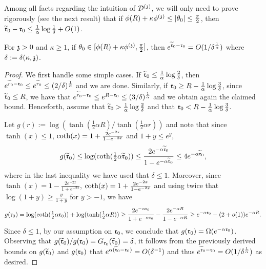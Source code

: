 Among all facts regarding the intuition of $\dt$, we will only need to prove rigorously (see the next result) that if $\phi(R)+\kappa\phi^{(\ss)}\leq |\theta_0|\leq\frac{\pi}{2}$, then $\widetilde{\rabs}_0-\rabs_0\leq\frac{1}{\alpha}\log\frac{1}{\delta}+O(1)$.
\begin{fact}\label{fct:radial-varphi2}
For $\ss> 0$ and $\kappa\geq 1$, 
if $\theta_0\in [\phi(R)+\kappa\phi^{(\ss)},\frac{\pi}{2}]$, then
  $e^{\widetilde{\rabs}_0-\rabs_0}=O(1/\delta^{\frac{1}{\alpha}})$
  where $\delta:=\delta(\kappa,\ss)$.
\end{fact}
\begin{proof}
We first handle some simple cases.
If $\widetilde{\rabs}_0\leq\frac{1}{\alpha}\log\frac{2}{\delta}$, then $e^{\widetilde{r}_0-\rabs_0}\leq e^{\widetilde{r}_0}\leq (2/\delta)^{\frac{1}{\alpha}}$ and we are done.
Similarly, if $\rabs_0\geq R-\frac{1}{\alpha}\log\frac{3}{\delta}$, since $\widetilde{\rabs}_0\leq R$, we have that $e^{\widetilde{r}_0-\rabs_0}\leq e^{R-\rabs_0}\leq (3/\delta)^{\frac{1}{\alpha}}$ and we obtain again the claimed bound. Henceforth, assume that $\widetilde{\rabs}_0>\frac{1}{\alpha}\log\frac{2}{\delta}$ and that $\rabs_0< R-\frac{1}{\alpha}\log\frac{3}{\delta}$.

Let $g(r):=\log(\tanh(\frac12\alpha R)/\tanh(\frac12\alpha r))$ and note that since $\tanh(x)\leq 1$, $\cotanh(x)=1+\frac{2e^{-2x}}{1-e^{-2x}}$ and $1+y\leq e^{y}$, 
\[g(\widetilde{\rabs}_0) \leq \log(\cotanh(\tfrac12\alpha\widetilde{\rabs}_0))
\leq\frac{2e^{-\alpha\widetilde{\rabs}_0}}{1-e^{-\alpha\widetilde{\rabs}_0}}\leq4e^{-\alpha\widetilde{\rabs}_0},\]
where in the last inequality we have used that $\delta\leq 1$. Moreover, since $\tanh(x)=1-\frac{2e^{-2x}}{1+e^{-2x}}$, 
$\cotanh(x)=1+\frac{2e^{-2x}}{1-e^{-2x}}$ and
using twice that $\log(1+y)\geq \frac{y}{1+y}$ for $y>-1$, we have
\[
g(\rabs_0) = \log(\coth(\tfrac12\alpha\rabs_0))+\log(\tanh(\tfrac12\alpha R)) \geq \frac{2e^{-\alpha\rabs_0}}{1+e^{-\alpha\rabs_0}} - 
\frac{2e^{-\alpha R}}{1-e^{-\alpha R}}
\geq e^{-\alpha\rabs_0}-(2+o(1))e^{-\alpha R}.
\]
Since $\delta\leq 1$, by our assumption on $\rabs_0$, we conclude that
  $g(\rabs_0)=\Omega(e^{-\alpha\rabs_0})$. Observing that $g(\widetilde{\rabs}_0)/g(\rabs_0)=G_{\rabs_0}(\widetilde{\rabs}_0)=\delta$, it follows from the 
previously derived bounds on $g(\widetilde{\rabs}_0)$ and $g(\rabs_0)$ 
that $e^{\alpha(\widetilde{\rabs}_0-\rabs_0)}=O(\delta^{-1})$ 
and thus $e^{\widetilde{\rabs}_0-\rabs_0}=O(1/\delta^{\frac{1}{\alpha}})$ as desired.
\end{proof}
